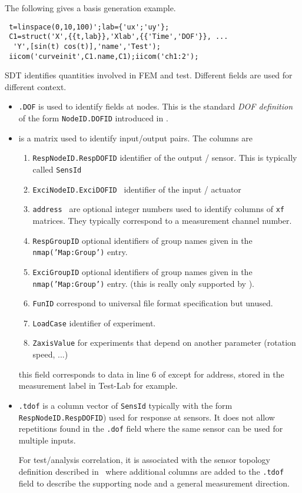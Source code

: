 The following gives a basis generation example. 

\begin{verbatim}
 t=linspace(0,10,100)';lab={'ux';'uy'};
 C1=struct('X',{{t,lab}},'Xlab',{{'Time','DOF'}}, ...
  'Y',[sin(t) cos(t)],'name','Test');
 iicom('curveinit',C1.name,C1);iicom('ch1:2');
\end{verbatim}%



SDT identifies quantities involved in FEM and test. Different fields are used for different context. 
\begin{itemize}
 \item {\tt .DOF} is used to identify fields at nodes. This is the standard {\sl DOF definition} of the form {\tt NodeID.DOFID} introduced in . 
 \item {} is a matrix used to identify input/output pairs. The columns are
 \begin{enumerate}
  \item {\tt RespNodeID.RespDOFID} identifier of the output / sensor. This is typically called {\tt SensId}
  \item {\tt ExciNodeID.ExciDOFID } identifier of the input / actuator
  \item {\tt address } are optional integer numbers used to identify columns of {\tt xf} matrices. They typically correspond to a measurement channel number.
  \item {\tt RespGroupID} optional identifiers of group names given in the {\tt nmap('Map:Group')} entry. 
  \item {\tt ExciGroupID} optional identifiers of group names given in the {\tt nmap('Map:Group')} entry. (this is really only supported by \ufread). 

  \item {\tt FunID} correspond to universal file format specification but unused. 
  \item {\tt LoadCase} identifier of experiment.
  \item {\tt ZaxisValue} for experiments that depend on another parameter (rotation speed, ...)
 \end{enumerate} 
this field corresponds to data in line 6 of  except for address, stored in the measurement label in Test-Lab for example. 

\item {\tt .tdof} is a column vector of {\tt SensId} typically with the form {\tt RespNodeID.RespDOFID}) used for response at sensors. It does not allow repetitions found in the {\tt .dof} field where the same sensor can be used for multiple inputs.  

For test/analysis correlation, it is associated with the sensor topology definition described in~ where additional columns are added to the {\tt .tdof} field to describe the supporting node and a general measurement direction. 
 
\end{itemize}





